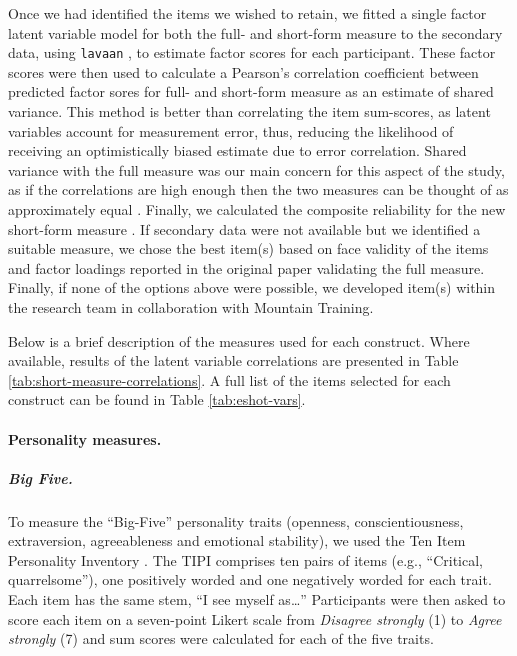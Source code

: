 \documentclass[
  12pt,
  a4paper,
]{book}
\begin{document}
Once we had identified the items we wished to retain, we fitted a single factor latent variable model for both the full- and short-form measure to the secondary data, using \texttt{lavaan} \citep{R-lavaan}, to estimate factor scores for each participant. These factor scores were then used to calculate a Pearson's correlation coefficient between predicted factor sores for full- and short-form measure as an estimate of shared variance. This method is better than correlating the item sum-scores, as latent variables account for measurement error, thus, reducing the likelihood of receiving an optimistically biased estimate due to error correlation. Shared variance with the full measure was our main concern for this aspect of the study, as if the correlations are high enough then the two measures can be thought of as approximately equal \citep{Smith2000}. Finally, we calculated the composite reliability for the new short-form measure \citep[\(\omega\);][]{Fornell1981}. If secondary data were not available but we identified a suitable measure, we chose the best item(s) based on face validity of the items and factor loadings reported in the original paper validating the full measure. Finally, if none of the options above were possible, we developed item(s) within the research team in collaboration with Mountain Training.

Below is a brief description of the measures used for each construct. Where available, results of the latent variable correlations are presented in Table \ref{tab:short-measure-correlations}. A full list of the items selected for each construct can be found in Table \ref{tab:eshot-vars}.

\hypertarget{personality-measures.}{%
\paragraph{Personality measures.}\label{personality-measures.}}

\hypertarget{big-five.}{%
\subparagraph{Big Five.}\label{big-five.}}

To measure the ``Big-Five'' personality traits (openness, conscientiousness, extraversion, agreeableness and emotional stability), we used the Ten Item Personality Inventory \citep[TIPI;][]{Gosling2003}. The TIPI comprises ten pairs of items (e.g., ``Critical, quarrelsome''), one positively worded and one negatively worded for each trait. Each item has the same stem, ``I see myself as\ldots{}'' Participants were then asked to score each item on a seven-point Likert scale from \emph{Disagree strongly} (1) to \emph{Agree strongly} (7) and sum scores were calculated for each of the five traits.
\end{document}
